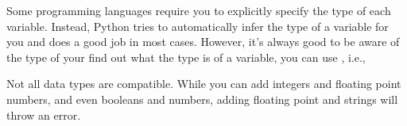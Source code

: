\documentclass[letterpaper,10pt,english]{jupyterBook}
\begin{document}
\sphinxAtStartPar
Some programming languages require you to explicitly specify the type of each variable. Instead, Python tries to automatically infer the type of a variable for you and does a good job in most cases. However, it’s always good to be aware of the type of your  find out what the type is of a variable, you can use , i.e.,

\begin{sphinxVerbatim}[commandchars=\\\{\}]
  
  
  
  
\end{sphinxVerbatim}

\sphinxAtStartPar
Not all data types are compatible. While you can add integers and floating point numbers, and even booleans and numbers, adding floating point and strings will throw an error.
\end{document}
